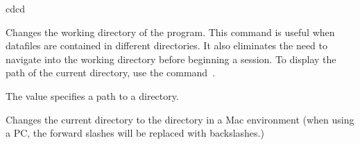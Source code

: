 \begin{command}{cd}{cd}

	\syntax{\obligatory{(\poystring)}}

	\begin{poydescription}
            Changes the working directory of the program. This command is useful
            when datafiles are contained in different directories. It also
            eliminates the need to navigate into the working directory before
            beginning a \poy session. To display the path of the current
            directory, use the command~.
	\end{poydescription}

	\begin{arguments}
            {The value specifies a path to a directory.}
            {}
	\end{arguments}
	
	\begin{poyexamples}

            {Changes the current directory to the directory in a Mac environment (when using a 
            PC, the forward slashes will be replaced with backslashes.)}
            

    \end{poyexamples}

    \begin{poyalso}
    \end{poyalso}

\end{command}

